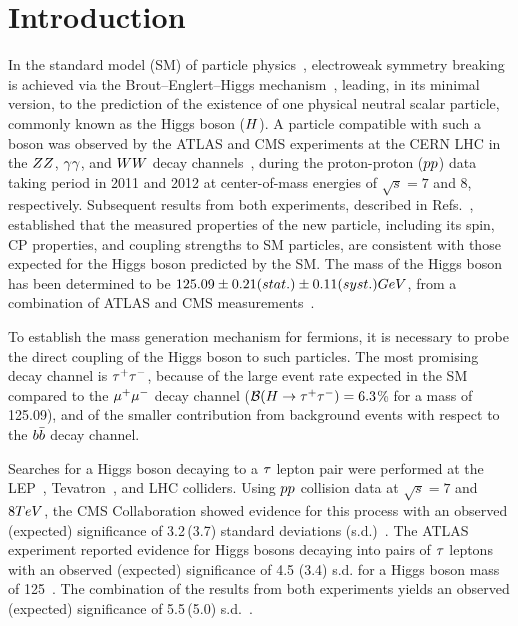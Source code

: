 \chapter{Introduction}

In the standard model (SM) of particle physics~\cite{Glashow:1961tr,SM1,SM3},
electroweak symmetry breaking is achieved via the Brout--Englert--Higgs
mechanism~\cite{Englert:1964et,Higgs:1964ia,Higgs:1964pj,Guralnik:1964eu,Higgs:1966ev,Kibble:1967sv},
leading, in its minimal version, to the prediction of the existence of one physical neutral scalar particle,
commonly known as the Higgs boson ($H$).
A particle compatible with such a boson was observed by the ATLAS and CMS experiments at the CERN LHC
in the $ZZ$, $\gamma \gamma$, and $WW$ decay channels~\cite{Aad:2012tfa, Chatrchyan:2012xdj, Chatrchyan:2013lba},
during the proton-proton ($pp$) data taking period in 2011 and 2012
at center-of-mass energies of $\sqrt{s} = 7$ and 8\TeV, respectively.
Subsequent results from both experiments, described in
Refs.~\cite{Aad:2015gba, Khachatryan:2014jba, Chatrchyan:2012jja, Aad:2013xqa, Khachatryan:2014kca,Sirunyan:2017exp},
established that the measured properties of the new particle,
including its spin, CP properties,
and coupling strengths to SM particles, are consistent with those expected for the Higgs boson predicted by the SM.
The mass of the Higgs boson has been determined to be
$125.09\pm0.21(stat.)\pm0.11(syst.)GeV$, from a combination of
ATLAS and CMS measurements~\cite{Aad:2015zhl}.

To establish the mass generation mechanism for fermions,
 it is necessary to probe the direct coupling of
the Higgs boson to such particles.
The most promising decay channel is $\tau^+\tau^-$,
because of the large event rate expected in the SM compared to the $\mu^+\mu^-$ decay channel ($\mathcal{B}(H\to\tau^+\tau^-)=6.3$\% for a mass of 125.09\GeV), and of the smaller contribution from background events
with respect to the $b\bar{b}$ decay channel.

Searches for a Higgs boson decaying to a $\tau$ lepton pair were performed at the LEP~\cite{Barate:2000ts,Abdallah:2003ip,Achard:2001pj,Abbiendi:2000ac},
Tevatron~\cite{Aaltonen:2012jh, Abazov:2012zj}, and LHC colliders.
Using $pp$ collision data at $\sqrt{s}=7$ and $8TeV$, the CMS Collaboration showed evidence for this process with an observed\,(expected)
significance of 3.2\,(3.7) standard deviations (s.d.)~\cite{Chatrchyan:2014nva}. The ATLAS
experiment reported evidence for Higgs bosons decaying into pairs
of $\tau$ leptons with an observed (expected) significance of 4.5 (3.4)
s.d. for a Higgs boson mass of 125\GeV~\cite{Aad:2015vsa}.
The combination of the results from both experiments yields an observed (expected)
significance of 5.5\,(5.0) s.d.~\cite{Khachatryan:2016vau}.

